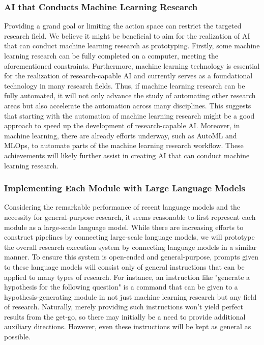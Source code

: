 \subsubsection{AI that Conducts Machine Learning Research}
Providing a grand goal or limiting the action space can restrict the targeted research field. We believe it might be beneficial to aim for the realization of AI that can conduct machine learning research as prototyping. Firstly, some machine learning research can be fully completed on a computer, meeting the aforementioned constraints. Furthermore, machine learning technology is essential for the realization of research-capable AI and currently serves as a foundational technology in many research fields. Thus, if machine learning research can be fully automated, it will not only advance the study of automating other research areas but also accelerate the automation across many disciplines. This suggests that starting with the automation of machine learning research might be a good approach to speed up the development of research-capable AI. Moreover, in machine learning, there are already efforts underway, such as AutoML and MLOps, to automate parts of the machine learning research workflow. These achievements will likely further assist in creating AI that can conduct machine learning research.

\subsubsection{Implementing Each Module with Large Language Models}

Considering the remarkable performance of recent language models and the necessity for general-purpose research, it seems reasonable to first represent each module as a large-scale language model. While there are increasing efforts to construct pipelines by connecting large-scale language models, we will prototype the overall research execution system by connecting language models in a similar manner. To ensure this system is open-ended and general-purpose, prompts given to these language models will consist only of general instructions that can be applied to many types of research. For instance, an instruction like "generate a hypothesis for the following question" is a command that can be given to a hypothesis-generating module in not just machine learning research but any field of research. Naturally, merely providing such instructions won't yield perfect results from the get-go, so there may initially be a need to provide additional auxiliary directions. However, even these instructions will be kept as general as possible.

